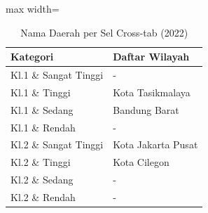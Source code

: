 \begin{table}[H]
\centering
\caption{Nama Daerah per Sel Cross-tab (2022)} \label{tab:crossname2022}
\begin{adjustbox}{max width=\textwidth}
\begin{tabular}{|p{4cm}|p{10cm}|}
\hline
\textbf{Kategori} & \textbf{Daftar Wilayah} \\
\hline
Kl.1 \& Sangat Tinggi & - \\
\hline
Kl.1 \& Tinggi & Kota Tasikmalaya \\
\hline
Kl.1 \& Sedang & Bandung Barat \\
\hline
Kl.1 \& Rendah & - \\
\hline
Kl.2 \& Sangat Tinggi & Kota Jakarta Pusat \\
\hline
Kl.2 \& Tinggi & Kota Cilegon \\
\hline
Kl.2 \& Sedang & - \\
\hline
Kl.2 \& Rendah & - \\
\hline
\end{tabular}
\end{adjustbox}
\end{table}